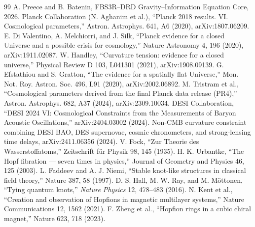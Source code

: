 \documentclass[11pt,a4paper]{article}
\begin{document}
\begin{thebibliography}{99}
 A. Preece and B. Batenin, FBS3R--DRD Gravity--Information Equation Core, 2026.
 Planck Collaboration (N. Aghanim et al.), ``Planck 2018 results. VI. Cosmological parameters,'' Astron. Astrophys. 641, A6 (2020), arXiv:1807.06209.
 E. Di Valentino, A. Melchiorri, and J. Silk, ``Planck evidence for a closed Universe and a possible crisis for cosmology,'' Nature Astronomy 4, 196 (2020), arXiv:1911.02087.
 W. Handley, ``Curvature tension: evidence for a closed universe,'' Physical Review D 103, L041301 (2021), arXiv:1908.09139.
 G. Efstathiou and S. Gratton, ``The evidence for a spatially flat Universe,'' Mon. Not. Roy. Astron. Soc. 496, L91 (2020), arXiv:2002.06892.
 M. Tristram et al., ``Cosmological parameters derived from the final Planck data release (PR4),'' Astron. Astrophys. 682, A37 (2024), arXiv:2309.10034.
 DESI Collaboration, ``DESI 2024 VI: Cosmological Constraints from the Measurements of Baryon Acoustic Oscillations,'' arXiv:2404.03002 (2024).
 Non-CMB curvature constraint combining DESI BAO, DES supernovae, cosmic chronometers, and strong-lensing time delays, arXiv:2411.06356 (2024).
 V. Fock, ``Zur Theorie des Wasserstoffatoms,'' Zeitschrift f\"ur Physik 98, 145 (1935).
 H. K. Urbantke, ``The Hopf fibration --- seven times in physics,'' Journal of Geometry and Physics 46, 125 (2003).
 L. Faddeev and A. J. Niemi, ``Stable knot-like structures in classical field theory,'' Nature 387, 58 (1997).
D. S. Hall, M. W. Ray, and M. M\"ottonen,
``Tying quantum knots,''
\emph{Nature Physics} 12, 478--483 (2016).
 N. Kent et al., ``Creation and observation of Hopfions in magnetic multilayer systems,'' Nature Communications 12, 1562 (2021).
 F. Zheng et al., ``Hopfion rings in a cubic chiral magnet,'' Nature 623, 718 (2023).
\end{thebibliography}
\end{document}
